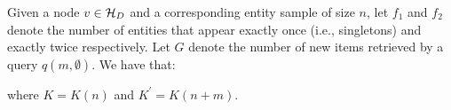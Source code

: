 \vspace{-5pt}\begin{theorem}
\label{newgain}
Given a node $v \in \mathcal{H}_D$ and a corresponding entity sample of size $n$, let $f_1$ and $f_2$ denote the number of entities that appear exactly once (i.e., singletons) and exactly twice respectively. Let $G$ denote the number of new items retrieved by a query $q(m,\emptyset)$. We have that:

where $K = K(n)$ and $K^{\prime} = K(n+m)$.
\end{theorem}
\iftr
